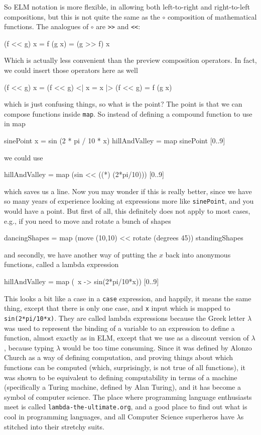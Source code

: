 \documentclass[12pt]{amsbook}
\begin{document}
So ELM notation is more flexible, in allowing both left-to-right and right-to-left compositions,
but this is not quite the same as the $\circ$ composition of mathematical functions.  
The analogues of $\circ$ are \texttt{>>} and \texttt{<<}:
\begin{code}
(f << g) x = f (g x) = (g >> f) x
\end{code} %
Which is actually less convenient than the preview composition operators.
In fact, we could insert those operators here as well
\begin{code}
(f << g) x = (f << g) <| x = x |> (f << g) = f (g x)
\end{code}
which is just confusing things,
so what is the point?
The point is that we can compose functions inside \texttt{map}.
So instead of defining a compound function to use in map
\begin{code}
sinePoint x = sin (2 * pi / 10 * x)
hillAndValley = map sinePoint [0..9]
\end{code}
we could use
\begin{code}
hillAndValley = map (sin << ((*) (2*pi/10))) [0..9]
\end{code}
which saves us a line.
Now you may wonder if this is really better, 
since we have so many years of experience looking at expressions more like \texttt{sinePoint},
and you would have a point.
But first of all, this definitely does not apply 
to most cases, e.g., if you need to move and rotate a bunch of shapes
\begin{code}
dancingShapes = map (move (10,10) << rotate (degrees 45)) standingShapes
\end{code}
and secondly, we have another way of putting the $x$ back into anonymous functions,
called a lambda expression
\begin{code}
hillAndValley = map (\ x -> sin(2*pi/10*x)) [0..9]
\end{code}
This looks a bit like a case in a \texttt{case}
expression,
and happily, it means the same thing, except
that there is only one case, and \texttt{x}
input which is mapped to \texttt{sin(2*pi/10*x)}.
They are called lambda expressions 
because the Greek letter $\lambda$ was
used to represent the binding of a variable 
to an expression to define a function,
almost exactly as in ELM,
except that we use \texttt{} as a discount version of 
$\lambda$, because typing $\lambda$ would be
too time consuming.
Since it was defined by Alonzo Church as a way of
defining computation, 
and proving things about which functions can be computed (which, surprisingly, is not true of all functions),
it was shown to be equivalent to defining
computability in terms of a machine
(specifically a Turing machine, defined by Alan Turing),
and it has become a symbol of computer science.
The place where programming language enthusiasts meet is called \texttt{lambda-the-ultimate.org}, 
and a good place to find out what is cool in programming languages,
and all Computer Science superheros have $\lambda$s stitched into their stretchy suits.
\end{document}

